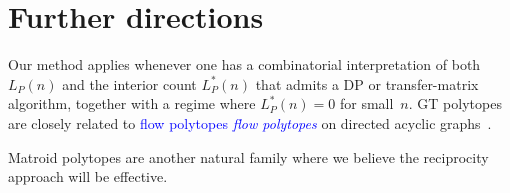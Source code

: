 \documentclass[11pt,reqno]{amsart}
\theoremstyle{definition}
\newcommand{\Ehr}{L}
\newcommand{\Ehrstar}{L^{*}}
\newcommand{\defin}[1]{%
\relax\ifmmode%
\textcolor{blue}{#1}%
\else \textcolor{blue}{\emph{#1}}%
\fi%
}
\begin{document}
\section{Further directions}\label{sec:furtherDirections}

Our method applies whenever one has a combinatorial interpretation
of both $\Ehr_P(n)$ and the interior count $\Ehrstar_P(n)$ that
admits a DP or transfer-matrix algorithm, together with a regime
where $\Ehrstar_P(n) = 0$ for small~$n$.
GT polytopes are closely related to \defin{flow polytopes} on directed acyclic
graphs~\cite{LiuMeszarosDizier2019flow}.

Matroid polytopes are another natural family
where we believe the reciprocity approach will be effective.




\end{document}
